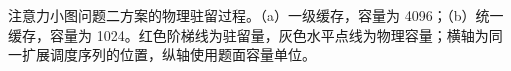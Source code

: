 注意力小图问题二方案的物理驻留过程。（a）一级缓存，容量为 4096；（b）统一缓存，容量为 1024。红色阶梯线为驻留量，灰色水平点线为物理容量；横轴为同一扩展调度序列的位置，纵轴使用题面容量单位。
